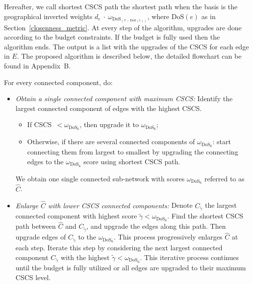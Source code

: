 \documentclass[lettersize,journal]{IEEEtran}
\begin{document}
Hereafter, we call shortest CSCS path the shortest path when the basis is the geographical inverted weights $d_e~\cdot ~\omega_{\text{DoS}_{(7-\text{DoS}(e))}}$, where $\text{DoS}(e)$ as in Section~\ref{closenness_metric}. At every step of the algorithm, upgrades are done according to the budget constraints. If the budget is fully used then the algorithm ends. The output is a list with the upgrades of the CSCS for each edge in $E$.
The proposed algorithm is described below, the detailed flowchart can be found in Appendix~B.

For every connected component, do:
\begin{itemize}
     \item[1)] \textit{Obtain a single connected component with maximum CSCS:}  Identify the largest connected component of edges with the highest CSCS. 
     \begin{itemize}
         \item[1.1)] If CSCS~$< \omega_{\text{DoS}_6}$, then upgrade it to $\omega_{\text{DoS}_6}$;
         \item[1.2)] Otherwise, if there are several connected components of $\omega_{\text{DoS}_6}$: start connecting them from largest to smallest by upgrading the connecting edges to the $\omega_{\text{DoS}_6}$ score using shortest CSCS path. 
     \end{itemize}
     
     We obtain one single connected sub-network with scores $\omega_{\text{DoS}_6}$ referred to as $\widehat{C}$.
     
    \item[2)] \textit{Enlarge $\widehat{C}$ with lower CSCS connected components:} Denote $C_{\tilde{\gamma}}$ the largest connected component with highest score $\tilde{\gamma}< \omega_{\text{DoS}_6}$.
    Find the shortest CSCS path between $\widehat{C}$ and $C_{\tilde{\gamma}}$, and upgrade the edges along this path. Then upgrade edges of $C_{\tilde{\gamma}}$ to the $\omega_{\text{DoS}_6}$. This process progressively enlarges $\widehat{C}$ at each step. Iterate this step by considering the next largest connected component  $C_{\tilde{\gamma}}$ with the highest $\tilde{\gamma}<\omega_{\text{DoS}_6}$. This iterative process continues until the budget is fully utilized or all edges are upgraded to their maximum CSCS level. 
    
\end{itemize}
 
\end{document}
